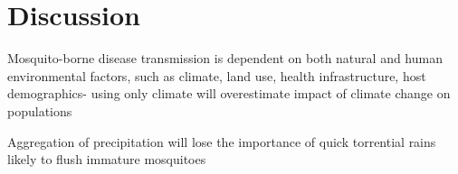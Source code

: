 \section{Discussion}

Mosquito-borne disease transmission is dependent on both natural and human environmental factors, such as climate, land use, health infrastructure, host demographics- using only climate will overestimate impact of climate change on populations \citep{Parham2015}

Aggregation of precipitation will lose the importance of quick torrential rains likely to flush immature mosquitoes \citep{Koenraadt2008}